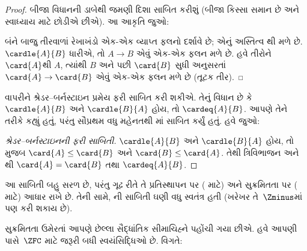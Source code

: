 \begin{proof}
બીજા વિધાનની ડાબેથી જમણી દિશા સાબિત કરીશું
(બીજા કિસ્સા સમાન છે અને સ્વાધ્યાય માટે છોડીએ છીએ).
આ આકૃતિ જુઓ:
\begin{center}
\end{center}
બંને બાજુ તીરવાળાં રેખાખંડો એક-એક વ્યાપ્ત ફલનો દર્શાવે છે;
એનું અસ્તિત્વ થી મળે છે.
$\cardle{A}{B}$ ધારીએ, તો $A\to B$ એવું
એક-એક ફલન મળે છે. હવે તીરોને $\card{A}$થી
$A$, ત્યાંથી $B$ અને પછી $\card{B}$ સુધી અનુસરતાં
$\card{A} \to \card{B}$ એવું એક-એક ફલન મળે
છે (તૂટક તીર).
\end{proof}\noindent {} વાપરીને
શ્રેડર--બર્નસ્ટાઇન પ્રમેય ફરી સાબિત કરી શકીએ.
તેનું વિધાન છે કે $\cardle{A}{B}$ અને
$\cardle{B}{A}$ હોય, તો $\cardeq{A}{B}$.
આપણે તેને 
તરીકે કહ્યું હતું, પરંતુ સૌપ્રથમ વધુ મહેનતથી
માં સાબિત કર્યું હતું.
હવે જુઓ:

\begin{proof}[શ્રેડર--બર્નસ્ટાઇનની ફરી સાબિતી]
$\cardle{A}{B}$ અને $\cardle{B}{A}$ હોય, તો
 મુજબ
$\card{A} \leq \card{B}$ અને
$\card{B} \leq \card{A}$. તેથી ત્રિવિભાજન અને
થી
$\card{A} = \card{B}$ તથા $\cardeq{A}{B}$.
\end{proof}
\noindent
આ સાબિતી બહુ સરળ છે, પરંતુ ગૂઢ રીતે તે
પ્રતિસ્થાપન પર
(
માટે) અને સુક્રમિતતા પર
( માટે)
આધાર રાખે છે. તેની સામે,
ની સાબિતી
ઘણી વધુ સ્વતંત્ર હતી (ખરેખર તે~$\Zminus$માં પણ
કરી શકાય છે).
\endgroup

\begingroup
\makeatletter{}\makeatother

\label{guunit:OLP-0583}


સુક્રમિતતા ઉમેરતાં આપણે છેલ્લા સૈદ્ધાંતિક
સીમાચિહ્ને પહોંચી ગયા છીએ. હવે આપણી પાસે~$\ZFC$
માટે જરૂરી બધી સ્વયંસિદ્ધિઓ છે. વિગતે:

